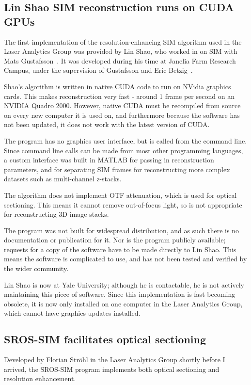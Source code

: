 \subsection{Lin Shao SIM reconstruction runs on CUDA GPUs}
The first implementation of the resolution-enhancing SIM algorithm used in the Laser Analytics Group was provided by Lin Shao, who worked in on SIM with Mats Gustafsson~\cite{shao2011super}.
It was developed during his time at Janelia Farm Research Campus, under the supervision of Gustafsson and Eric Betzig~\cite{beach2014nonmuscle}.

Shao's algorithm is written in native CUDA code to run on NVidia graphics cards.
This makes reconstruction very fast - around 1 frame per second on an NVIDIA Quadro 2000. 
However, native CUDA must be recompiled from source on every new computer it is used on, and furthermore because the software has not been updated, it does not work with the latest version of CUDA. 

The program has no graphics user interface, but is called from the command line. 
Since command line calls can be made from most other programming languages, a custom interface was built in MATLAB for passing in reconstruction parameters, and for separating SIM frames for reconstructing more complex datasets such as multi-channel z-stacks. 

The algorithm does not implement OTF attenuation, which is used for optical sectioning.
This means it cannot remove out-of-focus light, so is not appropriate for reconstructing 3D image stacks. 

The program was not built for widespread distribution, and as such there is no documentation or publication for it. 
Nor is the program publicly available; requests for a copy of the software have to be made directly to Lin Shao. 
This means the software is complicated to use, and has not been tested and verified by the wider community. 

Lin Shao is now at Yale University; although he is contactable, he is not actively maintaining this piece of software.
Since this implementation is fast becoming obsolete, it is now only installed on one computer in the Laser Analytics Group, which cannot have graphics updates installed. 

\subsection{SROS-SIM facilitates optical sectioning}
Developed by Florian Str\"ohl in the Laser Analytics Group shortly before I arrived, the SROS-SIM program implements both optical sectioning and resolution enhancement. 

